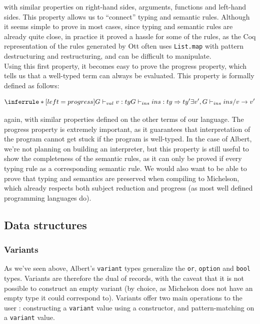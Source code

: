 \documentclass{report}
\begin{document}
with similar properties on right-hand sides, arguments, functions and left-hand sides. This property allows us to ``connect'' typing and semantic rules. Although it seems simple to prove in most cases, since typing and semantic rules are already quite close, in practice it proved a hassle for some of the rules, as the Coq representation of the rules generated by Ott often uses \texttt{List.map} with pattern destructuring and restructuring, and can be difficult to manipulate.\\

Using this first property, it becomes easy to prove the progress property, which tells us that a well-typed term can always be evaluated. This property is formally defined as follows:

$$
\inferrule* [left=progress]
            { G \vdash_{val} v : ty \\ G \vdash_{ins} ins : ty \Rightarrow ty' }
            { \exists v', G \vdash_{ins} ins / v \rightarrow v' }
$$

again, with similar properties defined on the other terms of our language. The progress property is extremely important, as it guarantees that interpretation of the program cannot get stuck if the program is well-typed. In the case of Albert, we're not planning on building an interpreter, but this property is still useful to show the completeness of the semantic rules, as it can only be proved if every typing rule as a corresponding semantic rule. We would also want to be able to prove that typing and semantics are preserved when compiling to Michelson, which already respects both subject reduction and progress (as most well defined programming languages do).

\subsection{Data structures}

\subsubsection{Variants}

As we've seen above, Albert's \texttt{variant} types generalize the \texttt{or}, \texttt{option} and \texttt{bool} types. Variants are therefore the dual of records, with the caveat that it is not possible to construct an empty variant (by choice, as Michelson does not have an empty type it could correspond to). Variants offer two main operations to the user : constructing a \texttt{variant} value using a constructor, and pattern-matching on a \texttt{variant} value.
\end{document}
